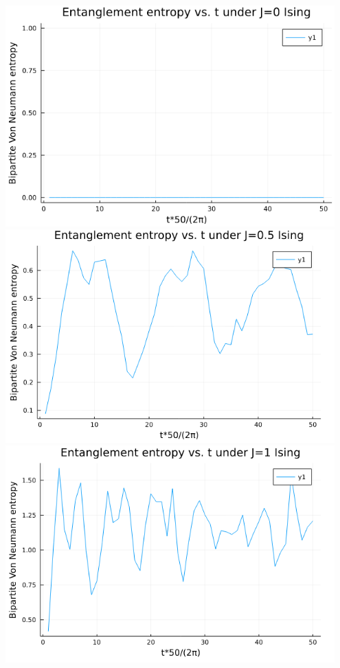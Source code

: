 \documentclass[12pt]{article}
\newenvironment{Figure}
  {\par\medskip\noindent\minipage{\linewidth}}
  {\endminipage\par\medskip}
\begin{document}
\begin{multicols}{2}
	\begin{Figure}
		\center\includegraphics[width=0.95\textwidth]{./Figures/j-0-entanglement.png}\\
		\center\includegraphics[width=0.95\textwidth]{./Figures/j-0-5-entanglement.png}
		\center\includegraphics[width=0.95\textwidth]{./Figures/j-1-entanglement.png}
		\label{entanglement-graphs}
	\end{Figure}




\end{multicols}
\end{document}
